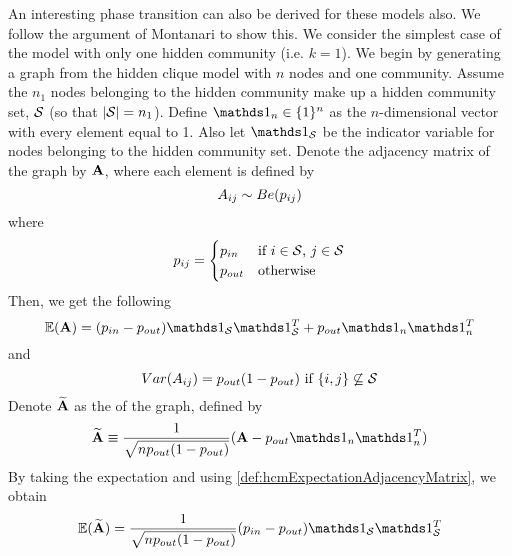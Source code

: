 An interesting phase transition can also be derived for these models also. We follow the argument of Montanari \cite{DM13,Mon13} to show this. We consider the simplest case of the model with only one hidden community (i.e. $k = 1$).
We begin by generating a graph from the hidden clique model with $n$ nodes and one community.
Assume the $n_{1}$ nodes belonging to the hidden community make up a hidden community set, $\mathcal S$ (so that $\left\vert\mathcal S\right\vert = n_{1}$). Define $\one_{n} \in \{1\}^{n}$ as the $n$-dimensional vector with every element equal to 1.
Also let $\one_{\setvar{S}}$ be the indicator variable for nodes belonging to the hidden community set.
Denote the adjacency matrix of the graph by $\mathbf A$, where each element is defined by
\begin{equation}
	\label{def:hcmAdjacencyMatrix}
	A_{ij} \sim Be(p_{ij})
\end{equation}
where 
\begin{equation}
	\label{def:hcmPijAdjacencyMatrix}
	p_{ij} =	
	\begin{cases}
		p_{in} & \text{if } i \in \mathcal S \text{, } j \in \mathcal S \\
		p_{out} & \text{otherwise}
	\end{cases}
\end{equation}
Then, we get the following
\begin{equation}
	\label{def:hcmExpectationAdjacencyMatrix}
	\expectation{\matvar{A}} = (p_{in} - p_{out})\one_{\setvar{S}}\transpose{\one_{\setvar{S}}} + p_{out}\one_{n}\transpose{\one_{n}}
\end{equation}
and
\begin{equation}
	\label{def:hcmVarianceAdjacencyMatrix}
	Var(A_{ij}) = p_{out}(1-p_{out}) \text{ if } \{i,j\} \not\subseteq \mathcal S
\end{equation}
Denote $\widetilde{\mathbf A}$ as the  of the graph, defined by
\begin{equation}
	\label{def:hcmNormlaisedAdjacencyMatrix}
	\widetilde{\matvar{A}} \equiv \frac{1}{\sqrt{np_{out}(1-p_{out})}} (\matvar{A} - p_{out}\one_{n}\transpose{\one_{n}})
\end{equation}
By taking the expectation and using \cref{def:hcmExpectationAdjacencyMatrix}, we obtain
\begin{equation}
	\label{def:hcmExpectationNormalisedAdjacencyMatrix}
	\expectation{\widetilde{\matvar{A}}} = \frac{1}{\sqrt{np_{out}(1-p_{out})}} (p_{in} - p_{out}) \one_{\setvar{S}}\transpose{\one_{\setvar{S}}}
\end{equation}
